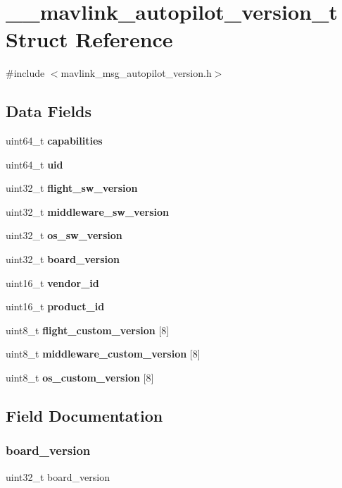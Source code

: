\section{\+\_\+\+\_\+mavlink\+\_\+autopilot\+\_\+version\+\_\+t Struct Reference}
\label{struct____mavlink__autopilot__version__t}


{\ttfamily \#include $<$mavlink\+\_\+msg\+\_\+autopilot\+\_\+version.\+h$>$}

\subsection*{Data Fields}
\begin{DoxyCompactItemize}
\item 
uint64\+\_\+t \textbf{ capabilities}
\item 
uint64\+\_\+t \textbf{ uid}
\item 
uint32\+\_\+t \textbf{ flight\+\_\+sw\+\_\+version}
\item 
uint32\+\_\+t \textbf{ middleware\+\_\+sw\+\_\+version}
\item 
uint32\+\_\+t \textbf{ os\+\_\+sw\+\_\+version}
\item 
uint32\+\_\+t \textbf{ board\+\_\+version}
\item 
uint16\+\_\+t \textbf{ vendor\+\_\+id}
\item 
uint16\+\_\+t \textbf{ product\+\_\+id}
\item 
uint8\+\_\+t \textbf{ flight\+\_\+custom\+\_\+version} [8]
\item 
uint8\+\_\+t \textbf{ middleware\+\_\+custom\+\_\+version} [8]
\item 
uint8\+\_\+t \textbf{ os\+\_\+custom\+\_\+version} [8]
\end{DoxyCompactItemize}


\subsection{Field Documentation}
\mbox{\label{struct____mavlink__autopilot__version__t_a122ec4f129cffbbe102d7cce98b1c487}} 
\subsubsection{board\+\_\+version}
{\footnotesize\ttfamily uint32\+\_\+t board\+\_\+version}

